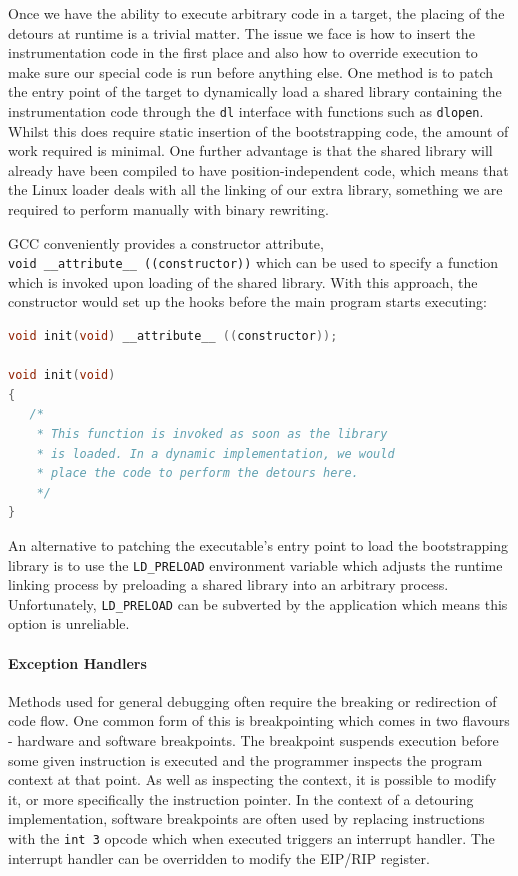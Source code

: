 Once we have the ability to execute arbitrary code in a target, the placing of the detours at runtime is a trivial matter. The issue we face is how to insert the instrumentation code in the first place and also how to override execution to make sure our special code is run before anything else. One method is to patch the entry point of the target to dynamically load a shared library containing the instrumentation code through the \texttt{dl} interface with functions such as \texttt{dlopen}.  Whilst this does require static insertion of the bootstrapping code, the amount of work required is minimal. One further advantage is that the shared library will already have been compiled to have position-independent code, which means that the Linux loader deals with all the linking of our extra library, something we are required to perform manually with binary rewriting.

GCC conveniently provides a constructor attribute, \texttt{\mbox{void \_\_attribute\_\_ ((constructor))}} which can be used to specify a function which is invoked upon loading of the shared library. With this approach, the constructor would set up the hooks before the main program starts executing:

\begin{lstlisting}[language=C,caption={This example would be compiled as a shared library}]
void init(void) __attribute__ ((constructor));

void init(void)
{
   /*
    * This function is invoked as soon as the library 
    * is loaded. In a dynamic implementation, we would
    * place the code to perform the detours here.
    */
}
\end{lstlisting}

An alternative to patching the executable's entry point to load the bootstrapping library is to use the \texttt{LD\_PRELOAD} environment variable which adjusts the runtime linking process by preloading a shared library into an arbitrary process. Unfortunately, \texttt{LD\_PRELOAD} can be subverted by the application which means this option is unreliable.

\paragraph{Exception Handlers}

Methods used for general debugging often require the breaking or redirection of code flow. One common form of this is breakpointing which comes in two flavours - hardware and software breakpoints. The breakpoint suspends execution before some given instruction is executed and the programmer inspects the program context at that point. As well as inspecting the context, it is possible to modify it, or more specifically the instruction pointer. In the context of a detouring implementation, software breakpoints are often used by replacing instructions with the \texttt{int 3} opcode which when executed triggers an interrupt handler. The interrupt handler can be overridden to modify the EIP/RIP register\cite{fast_breakpoints, profiling_unix, kprobes}.

